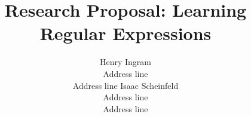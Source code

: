 \documentclass[letterpaper]{article}
\title{Research Proposal: Learning Regular Expressions}
\author{Henry Ingram\\ Address line \\ Address line \And
Isaac Scheinfeld \\ Address line \\ Address line}
\begin{document}
 \maketitle
\abstract{}
 
 
 
\end{document}
